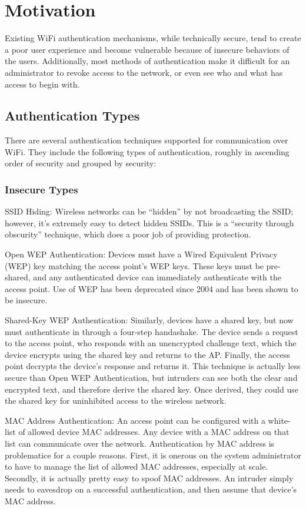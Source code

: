 \section{Motivation}
\label{section:motivation}
Existing WiFi authentication mechanisms, while technically secure, tend to create a poor user
experience and become vulnerable because of insecure behaviors of the users. Additionally,
most methods of authentication make it difficult for an administrator to revoke access to the
network, or even see who and what has access to begin with.

\subsection{Authentication Types}
There are several authentication techniques supported for communication over WiFi. They include
the following types of authentication, roughly in ascending order of security and grouped by security:
\cite{WifiAuthenticationTypes} \cite{wiki:WirelessSecurity}

\subsubsection{Insecure Types}
\begin{description}
\item{SSID Hiding:} Wireless networks can be ``hidden'' by not broadcasting the SSID; however,
it's extremely easy to detect hidden SSIDs. This is a ``security through obscurity'' technique,
which does a poor job of providing protection.
\item{Open WEP Authentication:} Devices must have a Wired Equivalent Privacy (WEP) key matching
the access point's WEP keys. These keys must be pre-shared, and any authenticated device can
immediately authenticate with the access point. Use of WEP has been deprecated since 2004 and has
been shown to be insecure.
\item{Shared-Key WEP Authentication:} Similarly, devices have a shared key, but now must
authenticate in through a four-step handashake. The device sends a request to the access point,
who responds with an unencrypted challenge text, which the device encrypts using the shared key
and returns to the AP. Finally, the access point decrypts the device's response and returns it.
This technique is actually less secure than Open WEP Authentication, but intruders can see both
the clear and encrypted text, and therefore derive the shared key. Once derived, they could use
the shared key for uninhibited access to the wireless network.
\item{MAC Address Authentication:} An access point can be configured with a white-list of allowed
device MAC addresses. Any device with a MAC address on that list can communicate over the network.
Authentication by MAC address is problematice for a couple reasons. First, it is onerous on the
system administrator to have to manage the list of allowed MAC addresses, especially at scale.
Secondly, it is actually pretty easy to spoof MAC addresses. An intruder simply needs to eavesdrop
on a successful authentication, and then assume that device's MAC address.
\end{description}

